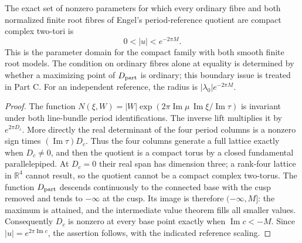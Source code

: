 \begin{proposition}\label{fam:src:B.1.2}\label{fam:st:B.1.2}
The exact set of nonzero parameters for which every ordinary fibre and both normalized finite root fibres of Engel's period-reference quotient are compact complex two-tori is
\[
 0<|u|<e^{-2\pi M}.
\]
This is the parameter domain for the compact family with both smooth finite root models. The condition on ordinary fibres alone at equality is determined by whether a maximizing point of $D_{\rm part}$ is ordinary; this boundary issue is treated in Part C. For an independent reference, the radius is $|\lambda_0|e^{-2\pi M}$.
\end{proposition}
\begin{proof}
The function $N(\xi,W)=|W|\exp(2\pi\operatorname{Im}\mu\,\operatorname{Im}\xi/\operatorname{Im}\tau)$ is invariant under both line-bundle period identifications. The inverse lift multiplies it by $e^{2\pi D_c}$. More directly the real determinant of the four period columns is a nonzero sign times $(\operatorname{Im}\tau)D_c$. Thus the four columns generate a full lattice exactly when $D_c\ne0$, and then the quotient is a compact torus by a closed fundamental parallelepiped. At $D_c=0$ their real span has dimension three; a rank-four lattice in $\mathbb R^4$ cannot result, so the quotient cannot be a compact complex two-torus. The function $D_{\rm part}$ descends continuously to the connected base with the cusp removed and tends to $-\infty$ at the cusp. Its image is therefore $(-\infty,M]$: the maximum is attained, and the intermediate value theorem fills all smaller values. Consequently $D_c$ is nonzero at every base point exactly when $\operatorname{Im}c<-M$. Since $|u|=e^{2\pi\operatorname{Im}c}$, the assertion follows, with the indicated reference scaling.
\end{proof}

